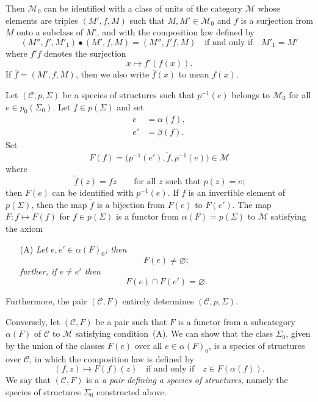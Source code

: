 \documentclass[a4paper,fleqn]{article}
\theoremstyle{plain}
\theoremstyle{definition}
\newcommand{\oldpage}[1]{{\marginpar{\footnotesize$\bigg\vert$\,\,\,\,\textit{p.~#1}}}}
\newcommand{\CC}{\mathcal{C}}
\newcommand{\MM}{\mathcal{M}}
\newcommand{\smallbullet}{\bullet}
\begin{document}
Then $\MM_0$ can be identified with a class of units of the category $\MM$ whose elements are triples $(M',f,M)$ such that $M,M'\in\MM_0$ and $f$ is a surjection from $M$ onto a subclass of $M'$, and with the composition law defined by
\[
  (M'',f',M'_1)\smallbullet(M',f,M)
  = (M'',f'f,M)
  \quad\text{if and only if}\quad
  M'_1=M'
\]
where $f'f$ denotes the surjection
\[
  x\longmapsto f'(f(x)).
\]
If $\overline{f}=(M',f,M)$, then we also write $\overline{f}(x)$ to mean $f(x)$.

Let $(\CC,p,\Sigma)$ be a species of structures such that $p^{-1}(e)$ belongs to $\MM_0$ for all $e\in p_0(\Sigma_0)$.
Let $f\in p(\Sigma)$ and set
\[
  \begin{aligned}
    e&=\alpha(f),
  \\e'&=\beta(f).
  \end{aligned}
\]
Set
\[
  F(f)
  = \big(p^{-1}(e'),\widetilde{f},p^{-1}(e)\big)
  \in\MM
\]
\oldpage{353}
where
\[
  \widetilde{f}(z)
  =fz
  \qquad\text{for all $z$ such that $p(z)=e$;}
\]
then $F(e)$ can be identified with $p^{-1}(e)$.
If $f$ is an invertible element of $p(\Sigma)$, then the map $\widetilde{f}$ is a bijection from $F(e)$ to $F(e')$.
The map $F\colon f\mapsto F(f)$ for $f\in p(\Sigma)$ is a functor from $\alpha(F)=p(\Sigma)$ to $\MM$ satisfying the axiom
\begin{enumerate}
  \item[(A)] \itshape
    Let $e,e'\in\alpha(F)_0$; then
    \[
      F(e)\neq\varnothing;
    \]
    further, if $e\neq e'$ then
    \[
      F(e)\cap F(e')=\varnothing.
    \]
\end{enumerate}
Furthermore, the pair $(\CC,F)$ entirely determines $(\CC,p,\Sigma)$.

Conversely, let $(\CC,F)$ be a pair such that $F$ is a functor from a subcategory $\alpha(F)$ of $\CC$ to $\MM$ satisfying condition~(A).
We can show \cite{3a} that the class $\Sigma_0$, given by the union of the classes $F(e)$ over all $e\in\alpha(F)_0$, is a species of structures over $\CC$, in which the composition law is defined by
\[
  (f,z)\longmapsto F(f)(z)
  \quad\text{if and only if}\quad
  z\in F(\alpha(f)).
\]
We say that $(\CC,F)$ is a \emph{a pair defining a species of structures}, namely the species of structures $\Sigma_0$ constructed above.
\end{document}
